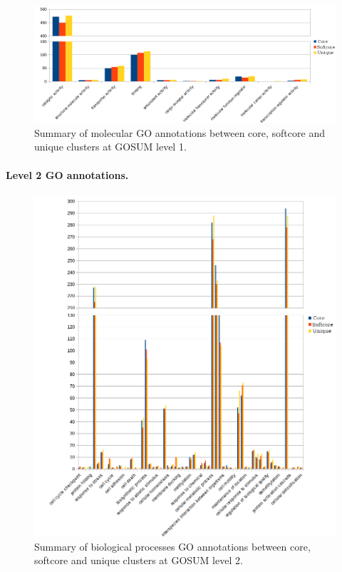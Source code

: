 \documentclass[12pt]{article}
\begin{document}
\begin{figure} 
\includegraphics[scale=.6]{3Aug18_cluster-investigation/figures/gosum-pan/Pan-gosum1-molec-split.png} 
\caption{Summary of molecular GO annotations between core, softcore and unique clusters at GOSUM level 1.} 
\label{fig:PanGo1Molec}
\end{figure} 
\FloatBarrier


\FloatBarrier
\paragraph{Level 2 GO annotations.}
\FloatBarrier


\begin{figure} 
\includegraphics[scale=.75]{3Aug18_cluster-investigation/figures/gosum-pan/Pan-gosum2-bio-split.png} 
\caption{Summary of biological processes GO annotations between core, softcore and unique clusters at GOSUM level 2.} 
\label{fig:PanGo2Bio}
\end{figure} 
\FloatBarrier
\end{document}
